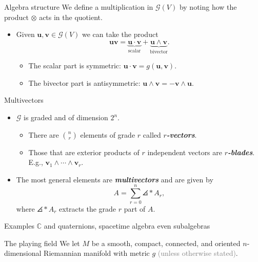 \documentclass[aspectratio=169,handout]{beamer}
\newcommand\boldgreen[1]{\textcolor{lighter_csu_green}{\emph{\textbf{#1}}}}
\newcommand{\C}{\mathbb{C}}
\newcommand{\G}{\mathcal{G}}
\newcommand{\blade}[1]{\boldsymbol{#1}}
\DeclarePairedDelimiter\angles{\langle}{\rangle}
\newcommand{\proj}[2]{\angles*{#2}_{#1}}
\begin{document}
\begin{frame}{Algebra structure}
\vfill
We define a multiplication in $\G(V)$ by noting how the product $\otimes$ acts in the quotient.
\begin{itemize}
\pause
    \item Given $\blade{u}, \blade{v} \in \G(V)$ we can take the product
    \[
    \blade{u}\blade{v} = \underbrace{\blade{u}\cdot \blade{v}}_{\textrm{scalar}} + \underbrace{\blade{u}\wedge \blade{v}}_{\textrm{bivector}}.
    \]
\pause
\begin{itemize}
    \item The scalar part is symmetric: $\blade{u}\cdot \blade{v} = g(\blade{u},\blade{v})$.
\pause
    \item The bivector part is antisymmetric: $\blade{u}\wedge \blade{v} = -\blade{v}\wedge \blade{u}$.
\end{itemize}
\end{itemize}
\vfill
\end{frame}

\begin{frame}{Multivectors}
\vfill
\begin{itemize}
    \pause
        \item $\G$ is graded and of dimension $2^n$.
    \begin{itemize}
    \pause
        \item There are ${n \choose r}$ elements of grade $r$ called \boldgreen{$r$-vectors}. 
        \item Those that are exterior products of $r$ independent vectors are \boldgreen{$r$-blades}. E.g., $\blade{v}_1 \wedge \cdots \wedge\blade{v}_r$.
    \end{itemize}
    \pause
        \item The most general elements are \boldgreen{multivectors} and are given by
        \[
        A = \sum_{r=0}^n \proj{r}{A},
        \]
        where $\proj{r}{A}$ extracts the grade $r$ part of $A$.
\end{itemize}
\vfill
\end{frame}

\begin{frame}{Examples}
$\C$ and quaternions, spacetime algebra even subalgebras
\end{frame}

\begin{frame}{The playing field}
\vfill
\pause
We let $M$ be a smooth, compact, connected, and oriented $n$-dimensional Riemannian manifold with metric $g$ \textcolor{gray}{(unless otherwise stated)}.
\begin{figure}[H]
	\centering
	\def\svgwidth{.6\columnwidth}
	
\end{figure}
\vfill
\end{frame}
\end{document}
